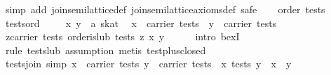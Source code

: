 \begin{isabellebody}
%
\isadelimproof
%
\endisadelimproof
%
\isatagproof
{}\isamarkupfalse%
\ {}simp\ add{}\ join{}semilattice{}def\ join{}semilattice{}axioms{}def{}\ safe{}\isanewline
\ \ \isamarkupfalse%
\ {}order\ tests{}\ \isamarkupfalse%
\ tests{}ord\ \isamarkupfalse%
\isanewline
\isanewline
\ \ \isamarkupfalse%
\ x\ y\ {}{}\ {}{}a\ skat{}\ \isamarkupfalse%
\ {}x\ {}\ carrier\ tests{}\ \ {}y\ {}\ carrier\ tests{}\isanewline
\ \ \isamarkupfalse%
\ {}{}z{}carrier\ tests{}\ order{}is{}lub\ tests\ z\ {}x{}\ y{}{}\isanewline
\ \ \ \ \isamarkupfalse%
\ {}intro\ bexI{}\ \isamarkupfalse%
\ {}rule\ tests{}lub{}\ assumption{}{}\ metis\ test{}plus{}closed{}\isanewline
{}\isamarkupfalse%
%
\endisatagproof
{\isafoldproof}%
%
\isadelimproof
\isanewline
%
\endisadelimproof
\isanewline
{}\isamarkupfalse%
\ tests{}join\ {}simp{}{}\ {}{}x\ {}\ carrier\ tests{}\ y\ {}\ carrier\ tests{}\ {}\ x\ {}\isactrlbsub tests\isactrlesub \ y\ {}\ x\ {}\ y{}\isanewline

\end{isabellebody}
